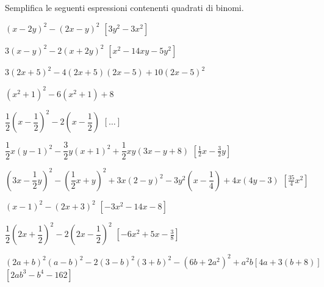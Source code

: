 \begin{esercizio}[\Ast]
 \label{ese:11.8}
Semplifica le seguenti espressioni contenenti quadrati di binomi.

\begin{enumeratea}
\spazielenx
 \item \(\left(x-2y\right)^{2}-\left(2x-y\right)^{2}\) 
  \hfill \(\left[3y^{2}-3x^{2}\right]\)
 \item \(3(x-y)^{2}-2(x+2y)^{2}\)
  \hfill \(\left[x^{2}-14xy-5y^{2}\right]\)
 \item \(3(2x+5)^{2}-4(2x+5)(2x-5)+10(2x-5)^{2}\)
 \item \(\left(x^{2}+1\right)^{2}-6\left(x^{2}+1\right)+8\)
 \item \(\dfrac{1}{2}\left(x-\dfrac{1}{2}\right)^{2}-
         2\left(x-\dfrac{1}{2}\right)\)
  \hfill \(\left[ \dots \right]\)
 \item 
\(\dfrac{1}{2}x(y-1)^{2}-\dfrac{3}{2}y(x+1)^{2}+\dfrac{1}{2}{xy}(3x-y+8)\)
  \hfill \(\left[\frac{1}{2}x-\frac{3}{2}y\right]\)
 \item \(\left(3x-\dfrac{1}{2}y\right)^{2}-
        \left(\dfrac{1}{2}x+y\right)^{2}+3x(2-y)^{2}
        -3y^{2}\left(x-\dfrac{1}{4}\right)+4x(4y-3)\)
  \hfill \(\left[\frac{35}{4}x^{2}\right]\)
 \item \(\left(x-1\right)^{2}-\left(2x+3\right)^{2}\)
  \hfill \(\left[-3x^{2}-14x-8\right]\)
 \item \(\dfrac{1}{2}\left(2x+\dfrac{1}{2}\right)^{2}-2\left(2x-
        \dfrac{1}{2}\right)^{2}\)
  \hfill \(\left[-6x^{2}+5x-\frac{3}{8}\right]\)
 \item \((2a+b)^{2}(a-b)^{2}-2(3-b)^{2}(3+b)^{2}-
        (6b+2a^{2})^{2}+a^{2}b[4a+3(b+8)]\)
  \hfill \(\left[2{ab}^{3}-b^{4}-162\right]\)
\end{enumeratea}
\end{esercizio}

